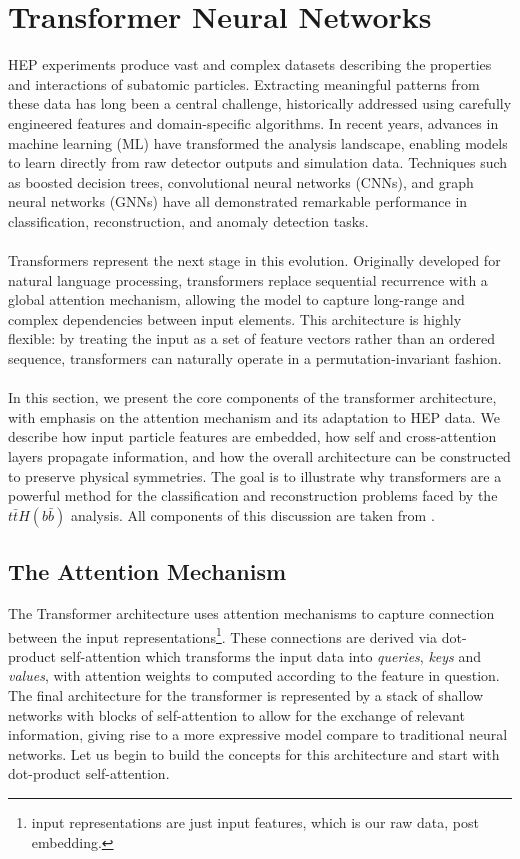 \section{Transformer Neural Networks}
HEP experiments produce vast and complex datasets describing the properties and interactions of subatomic particles. Extracting meaningful patterns from these data has long been a central challenge, historically addressed using carefully engineered features and domain-specific algorithms. In recent years, advances in machine learning (ML) have transformed the analysis landscape, enabling models to learn directly from raw detector outputs and simulation data. Techniques such as boosted decision trees, convolutional neural networks (CNNs), and graph neural networks (GNNs) have all demonstrated remarkable performance in classification, reconstruction, and anomaly detection tasks.\\
\\
Transformers represent the next stage in this evolution. Originally developed for natural language processing, transformers replace sequential recurrence with a global attention mechanism, allowing the model to capture long-range and complex dependencies between input elements. This architecture is highly flexible: by treating the input as a set of feature vectors rather than an ordered sequence, transformers can naturally operate in a permutation-invariant fashion.\\
\\
In this section, we present the core components of the transformer architecture, with emphasis on the attention mechanism and its adaptation to HEP data. We describe how input particle features are embedded, how self and cross-attention layers propagate information, and how the overall architecture can be constructed to preserve physical symmetries. The goal is to illustrate why transformers are a powerful method for the classification and reconstruction problems faced by the $t\bar{t}H(b\bar{b})$ analysis. All components of this discussion are taken from \cite{UDL}.
\subsection{The Attention Mechanism}
The Transformer architecture uses attention mechanisms to capture connection between the input representations\footnote{input representations are just input features, which is our raw data, post embedding.}. These connections are derived via dot-product self-attention which transforms the input data into \textit{queries}, \textit{keys} and \textit{values}, with attention weights to computed according to the feature in question. The final architecture for the transformer is represented by a stack of shallow networks with blocks of self-attention to allow for the exchange of relevant information, giving rise to a more expressive model compare to traditional neural networks. Let us begin to build the concepts for this architecture and start with dot-product self-attention.
